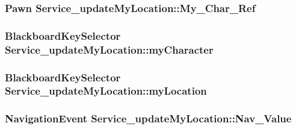 \subsubsection[{\texorpdfstring{My\+\_\+\+Char\+\_\+\+Ref}{My_Char_Ref}}]{\setlength{\rightskip}{0pt plus 5cm}Pawn Service\+\_\+update\+My\+Location\+::\+My\+\_\+\+Char\+\_\+\+Ref\hspace{0.3cm}{\ttfamily [private]}}\hypertarget{class_service__update_my_location_a73023cfeff259990fe879a830b3147e1}{}\label{class_service__update_my_location_a73023cfeff259990fe879a830b3147e1}
\subsubsection[{\texorpdfstring{my\+Character}{myCharacter}}]{\setlength{\rightskip}{0pt plus 5cm}Blackboard\+Key\+Selector Service\+\_\+update\+My\+Location\+::my\+Character}\hypertarget{class_service__update_my_location_af65a492f86eb3082328f78c249981ac4}{}\label{class_service__update_my_location_af65a492f86eb3082328f78c249981ac4}
\subsubsection[{\texorpdfstring{my\+Location}{myLocation}}]{\setlength{\rightskip}{0pt plus 5cm}Blackboard\+Key\+Selector Service\+\_\+update\+My\+Location\+::my\+Location}\hypertarget{class_service__update_my_location_acaa12f248f236e8068516533751daae4}{}\label{class_service__update_my_location_acaa12f248f236e8068516533751daae4}
\subsubsection[{\texorpdfstring{Nav\+\_\+\+Value}{Nav_Value}}]{\setlength{\rightskip}{0pt plus 5cm}Navigation\+Event Service\+\_\+update\+My\+Location\+::\+Nav\+\_\+\+Value\hspace{0.3cm}{\ttfamily [private]}}\hypertarget{class_service__update_my_location_a397ee106f8c92061b3d53a5a110c0098}{}\label{class_service__update_my_location_a397ee106f8c92061b3d53a5a110c0098}
